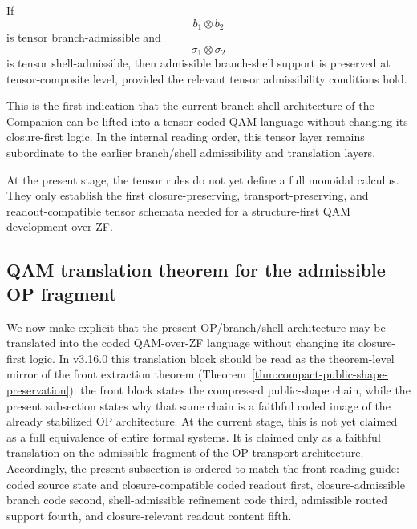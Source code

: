 \begin{corollary}
If
\[
b_1\otimes b_2
\]
is tensor branch-admissible and
\[
\sigma_1\otimes \sigma_2
\]
is tensor shell-admissible, then admissible branch-shell support is preserved at tensor-composite level, provided the relevant tensor admissibility conditions hold.
\end{corollary}

\begin{remark}
This is the first indication that the current branch-shell architecture of the Companion can be lifted into a tensor-coded QAM language without changing its closure-first logic. In the internal reading order, this tensor layer remains subordinate to the earlier branch/shell admissibility and translation layers.
\end{remark}

\begin{remark}
At the present stage, the tensor rules do not yet define a full monoidal calculus. They only establish the first closure-preserving, transport-preserving, and readout-compatible tensor schemata needed for a structure-first QAM development over ZF.
\end{remark}


\subsection*{QAM translation theorem for the admissible OP fragment}

We now make explicit that the present OP/branch/shell architecture may be translated into the coded QAM-over-ZF language without changing its closure-first logic. In v3.16.0 this translation block should be read as the theorem-level mirror of the front extraction theorem (Theorem~\ref{thm:compact-public-shape-preservation}): the front block states the compressed public-shape chain, while the present subsection states why that same chain is a faithful coded image of the already stabilized OP architecture. At the current stage, this is not yet claimed as a full equivalence of entire formal systems. It is claimed only as a faithful translation on the admissible fragment of the OP transport architecture. Accordingly, the present subsection is ordered to match the front reading guide: coded source state and closure-compatible coded readout first, closure-admissible branch code second, shell-admissible refinement code third, admissible routed support fourth, and closure-relevant readout content fifth.

